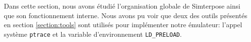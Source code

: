 Dans cette section, nous avons étudié l'organisation globale de Simterpose ainsi
que son fonctionnement interne. Nous avons pu voir que deux des outils présentés
en section \ref{section:tools} sont utilisés pour implémenter notre émulateur:
l'appel système \texttt{ptrace} et la variable
d'environnement \texttt{LD\_PRELOAD}.

